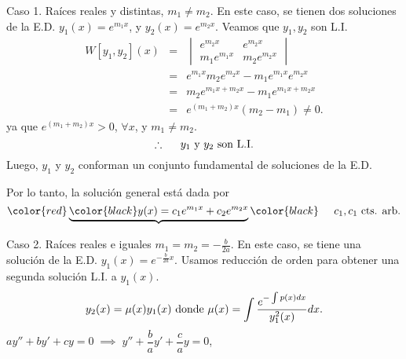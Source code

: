 \documentclass{beamer}
\begin{document}
\begin{frame}[t]
	\begin{block}{Caso 1. Raíces reales y distintas, \(m_1 \ne m_2\).}
		En este caso, se tienen dos soluciones de la E.D. \(y_1(x) = e^{m_1x}\), y \(y_2(x) =e^{m_2x}\). Veamos que \(y_1,y_2\) son L.I.
		\[
			\begin{array}{rcl}
				W[y_1,y_2] (x) & = & \begin{vmatrix}
					e^{m_2x} & e^{m_2x} \\
					m_1e^{m_1x} & m_2e^{m_2x}
				\end{vmatrix}\\[2mm]
				& = & e^{m_1x} m_2e^{m_2x} -m_1e^{m_1x} e^{m_2x} \\[2mm]
				& = & m_2e^{m_1x+m_2x} -m_1e^{m_1x+m_2x} \\[2mm]
				& = & e^{(m_1+m_2) x} (m_2-m_1) \ne 0.
			\end{array}
		\]
		ya que \(e^{(m_1+m_2) x} >0\), \(\forall x\), y \(m_1 \ne m_2\).
		\[
			\therefore \hspace{5mm} y_1 \mbox{ y } y_2 \mbox{ son L.I.}
		\]
		Luego, \(y_1\) y \(y_2\) conforman un conjunto fundamental de soluciones de la E.D. 
	\end{block}
\end{frame}

\begin{frame}[t]
	\begin{block}{}
		Por lo tanto, la solución general está dada por
		\[
			\color{red} \underbrace{\color{black} y(x) = c_1e^{m_1x} + c_2e^{m_2 x}} \color{black} \hspace{5mm} c_1,c_1 \mbox{ cts. arb.}
		\]
	\end{block} \vspace{7mm}
	\begin{block}{Caso 2. Raíces reales e iguales \(m_1=m_2 =- \frac{b}{2a}\).}
		En este caso, se tiene una solución de la E.D. \(y_1(x) = e^{- \frac{b}{2a}  x}\). Usamos reducción de orden para obtener una segunda solución L.I. a \(y_1(x)\).
		\[
			y_2(x) = \mu (x) y_1(x) \mbox{ donde } \mu (x) = \displaystyle\int \dfrac{e^{-\int p(x) dx}}{y_1^2(x)} dx.
		\]
		\(ay'' +by' +cy=0 \;\implies\; y'' + \dfrac{b}{a} y' + \dfrac{c}{a} y=0\),
	\end{block}
\end{frame}
\end{document}
